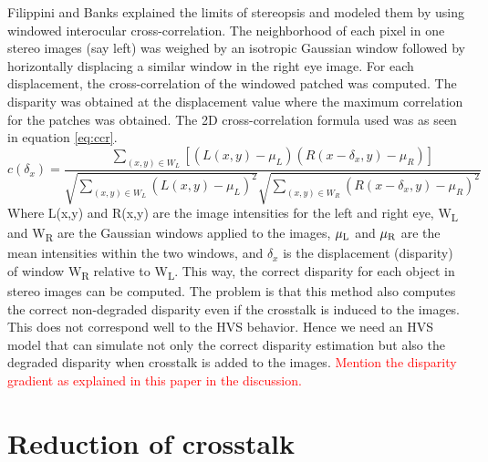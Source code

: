 Filippini and Banks \cite{filippini2009limits} explained the limits of stereopsis and modeled them by using windowed interocular cross-correlation. The neighborhood of each pixel in one stereo images (say left) was weighed by an isotropic Gaussian window followed by horizontally displacing a similar window in the right eye image. For each displacement, the cross-correlation of the windowed patched was computed. The disparity was obtained at the displacement value where the maximum correlation for the patches was obtained. The 2D cross-correlation formula used was as seen in equation \ref{eq:ccr}.
\begin{equation}
c(\delta_x) = \frac{ \sum\limits_{(x,y) \in W_L} [(L(x,y) - \mu_L)(R(x-\delta_x, y) - \mu_R)] }{\sqrt{\sum\limits_{(x,y) \in W_L}(L(x,y) - \mu_L)^2} \sqrt{\sum\limits_{(x,y) \in W_R}(R(x-\delta_x, y)- \mu_R)^2}}
\label{eq:ccr}
\end{equation}
Where L(x,y) and R(x,y) are the image intensities for the left and right eye, W\textsubscript{L} and W\textsubscript{R} are the Gaussian windows applied to the images, $\mu\textsubscript{L}$ and $\mu\textsubscript{R}$ are the mean intensities within the two windows, and $\delta_x$ is the displacement (disparity) of window W\textsubscript{R} relative to W\textsubscript{L}. This way, the correct disparity for each object in stereo images can be computed. The problem is that this method also computes the correct non-degraded disparity even if the crosstalk is induced to the images. This does not correspond well to the HVS behavior. Hence we need an HVS model that can simulate not only the correct disparity estimation but also the degraded disparity when crosstalk is added to the images. \textcolor{red}{Mention the disparity gradient as explained in this paper in the discussion.}

\section{Reduction of crosstalk}

